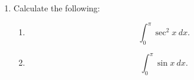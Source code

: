 \documentclass[letterpaper,11pt]{article}
\begin{document}
\begin{enumerate}
\item Calculate the following:
\begin{enumerate}
    \item \[\int_0^\pi \sec^2{x} \ dx.\]
    \vfill
    \item \[\int_0^\pi \sin{x} \ dx.\]
    \vfill
\end{enumerate}

\end{enumerate}
\end{document}
